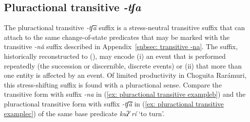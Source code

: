 \subsection{Pluractional transitive \textit{-tʃa }}
\label{subsec: pluractional transitive}

The pluractional transitive \textit{-tʃ͡a} suffix is a stress-neutral transitive suffix that can attach to the same change-of-state predicates that may be marked with the transitive \textit{-nâ} suffix described in Appendix~\ref{subsec: transitive -na}. The  suffix, historically reconstructed to  (\citealt{heath1978uto}), may encode (i) an event that is performed repeatedly (the succession or discernible, discrete events) or (ii) that more than one entity is affected by an event. Of limited productivity in Choguita Rarámuri, this stress-shifting suffix is found with a pluractional sense. Compare the transitive form with suffix \textit{-na} in (\ref{ex: pluractional transitive exampleb}) and the pluractional transitive form with suffix \textit{-tʃ͡á} in (\ref{ex: pluractional transitive examplec}) of the same base predicate \textit{kuʔˈrí} `to turn’.

\ea\label{ex: pluractional transitive example}

    \label{ex: pluractional transitive examplea}
        \label{ex: pluractional transitive exampleb}
            \label{ex: pluractional transitive examplec}
    \z
\z

